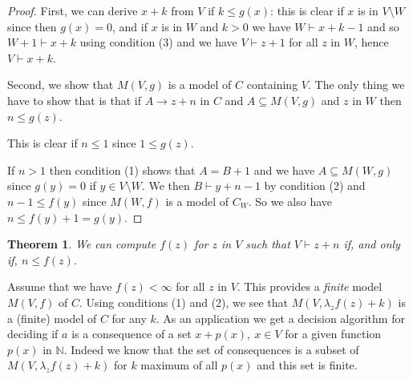 \documentclass[11pt,a4paper]{article}
\newtheorem{theorem}{Theorem}[section]
\newcommand{\nats}{\mathbb{N}}
\begin{document}
\begin{proof}
  First, we can derive $x+k$ from $V$ if $k\leqslant g(x)$: this is clear if $x$ is in $V\setminus W$
  since then $g(x) = 0$, and if $x$ is in $W$ and $k>0$ we have $W\vdash x+k-1$ and so $W+1\vdash x+k$
  using condition (3) and we have $V\vdash z+1$ for all $z$ in $W$, hence $V\vdash x+k$.

  Second,  we show that $M(V,g)$ is a model of $C$ containing $V$. The only thing we have to show that is that
  if $A\rightarrow z+n$ in $C$ and $A\subseteq M(V,g)$ and $z$ in $W$ then $n\leqslant g(z)$.

  This is clear if $n\leqslant 1$ since $1\leqslant g(z)$.

  If $n>1$ then condition (1) shows that $A = B+1$ and we have
  $A\subseteq M(W,g)$ since $g(y) = 0$ if $y\in V\setminus W$. We then $B\vdash y+n-1$
  by condition (2) and $n-1\leqslant f(y)$ since $M(W,f)$ is a model of $C_W$.
  So we also have $n\leqslant f(y)+1 = g(y)$.
\end{proof}

\begin{theorem}
We can compute $f(z)$ for $z$ in $V$ such that $V\vdash z+n$ if, and only if, $n\leqslant f(z)$.
\end{theorem}  


Assume that we have $f(z)<\infty$ for all $z$ in $V$. This provides a {\em finite} model $M(V,f)$
of $C$. Using conditions (1) and (2), we see that $M(V, \lambda_z f(z) +k)$ is a (finite) model of $C$
for any $k$. As an application we get a decision algorithm for deciding if $a$ is a consequence
of a set $x+p(x),~x\in V$ for a given function $p(x)$ in $\nats$. Indeed we know that the set of
consequences is a subset of $M(V, \lambda_z f(z)+k)$ for $k$ maximum of all $p(x)$ and this set
is finite.






\end{document}
